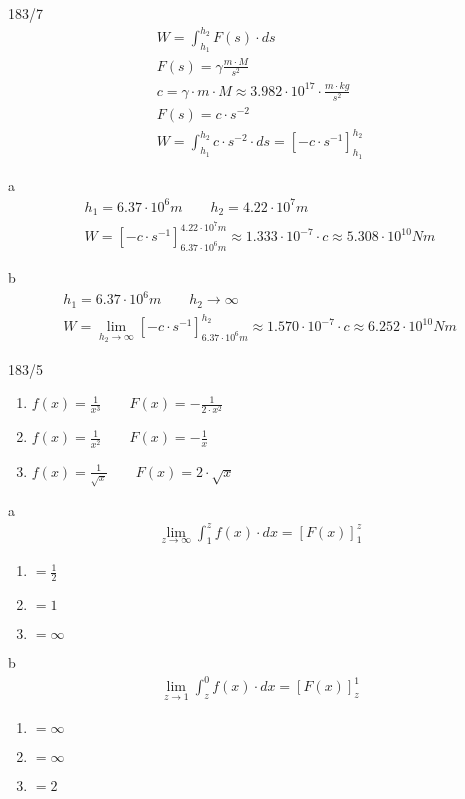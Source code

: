 \begin{exercise}{183/7}
 \begin{gather*}
   W = \int_{h_1}^{h_2} F(s) \cdot ds \\
   F(s) = \gamma \frac{m \cdot M}{s^2} \\
   c = \gamma \cdot m \cdot M \approx 3.982 \cdot 10^{17} \cdot \frac{m \cdot kg}{s^2} \\
   F(s) = c \cdot s^{-2} \\
   W = \int_{h_1}^{h_2} c \cdot s^{-2} \cdot ds = \left[-c \cdot s^{-1}\right]_{h_1}^{h_2}
 \end{gather*}
 \item [a]
 \begin{gather*}
   h_1 = 6.37 \cdot 10^6m \qquad h_2 = 4.22 \cdot 10^7m \\
   W = \left[-c \cdot s^{-1}\right]_{6.37 \cdot 10^6m}^{4.22 \cdot 10^7m} \approx 1.333 \cdot 10^{-7} \cdot c \approx 5.308 \cdot 10^{10}Nm
 \end{gather*}
 \item [b]
 \begin{gather*}
   h_1 = 6.37 \cdot 10^6m \qquad h_2 \rightarrow \infty \\
   W = \lim\limits_{h_2 \to \infty} \left[-c \cdot s^{-1}\right]_{6.37 \cdot 10^6m}^{h_2} \approx 1.570 \cdot 10^{-7} \cdot c \approx 6.252 \cdot 10^{10}Nm
 \end{gather*}
\end{exercise}
\newpage
\begin{exercise}{183/5}
  \begin{enumerate}[I]
    \item $f(x) = \frac{1}{x^3} \qquad F(x) = -\frac{1}{2 \cdot x^2}$
    \item $f(x) = \frac{1}{x^2} \qquad F(x) = -\frac{1}{x}$
    \item $f(x) = \frac{1}{\sqrt{x}} \qquad F(x) = 2 \cdot \sqrt{x}$
  \end{enumerate}
  \item [a]
  \begin{gather*}
    \lim\limits_{z \to \infty} \int_1^z f(x) \cdot dx = \left[F(x)\right]_1^z
  \end{gather*}
  \begin{enumerate}[I]
    \item $= \frac{1}{2}$
    \item $= 1$
    \item $= \infty$
  \end{enumerate}
  \item [b]
  \begin{gather*}
    \lim\limits_{z \to 1} \int_z^0 f(x) \cdot dx = \left[F(x)\right]_z^1
  \end{gather*}
  \begin{enumerate}[I]
    \item $= \infty$
    \item $= \infty$
    \item $= 2$
  \end{enumerate}
\end{exercise}
